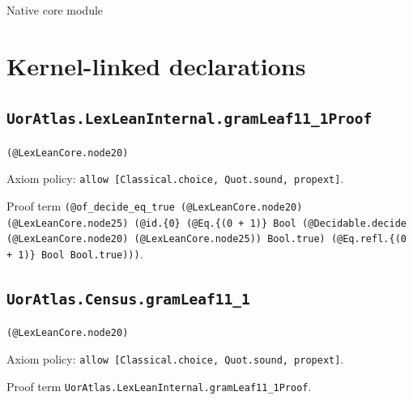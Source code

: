 \documentclass[11pt]{article}
\begin{document}
\begin{center}{\LARGE Native core module}\end{center}
\section*{Kernel-linked declarations}
\subsection*{\texttt{UorAtlas.LexLeanInternal.gramLeaf11\_1Proof}}
\noindent\texttt{(@LexLeanCore.node20)}\par
\noindent Axiom policy: \texttt{allow [Classical.choice, Quot.sound, propext]}.\par
\noindent Proof term \texttt{(@of\_decide\_eq\_true (@LexLeanCore.node20) (@LexLeanCore.node25) (@id.\{0\} (@Eq.\{(0 + 1)\} Bool (@Decidable.decide (@LexLeanCore.node20) (@LexLeanCore.node25)) Bool.true) (@Eq.refl.\{(0 + 1)\} Bool Bool.true)))}.\par
\subsection*{\texttt{UorAtlas.Census.gramLeaf11\_1}}
\noindent\texttt{(@LexLeanCore.node20)}\par
\noindent Axiom policy: \texttt{allow [Classical.choice, Quot.sound, propext]}.\par
\noindent Proof term \texttt{UorAtlas.LexLeanInternal.gramLeaf11\_1Proof}.\par
\end{document}
